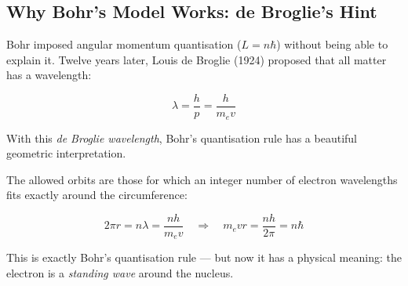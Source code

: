 \documentclass[12pt, a4paper]{book}
\newcommand{\newterm}[1]{\textit{\textcolor{DiscoveryColor}{#1}}}
\begin{document}
\subsection{Why Bohr's Model Works: de Broglie's Hint}

Bohr imposed angular momentum quantisation ($L = n\hbar$)
without being able to explain it.
Twelve years later, Louis de Broglie (1924) proposed that
all matter has a wavelength:

\[
  \lambda = \frac{h}{p} = \frac{h}{m_e v}
\]

With this \newterm{de Broglie wavelength}, Bohr's quantisation
rule has a beautiful geometric interpretation.

The allowed orbits are those for which an integer number
of electron wavelengths fits exactly around the circumference:

\[
  2\pi r = n\lambda = \frac{nh}{m_e v}
  \quad\Rightarrow\quad
  m_e v r = \frac{nh}{2\pi} = n\hbar
\]

This is exactly Bohr's quantisation rule --- but now it
has a physical meaning: the electron is a \emph{standing wave}
around the nucleus.
\end{document}

